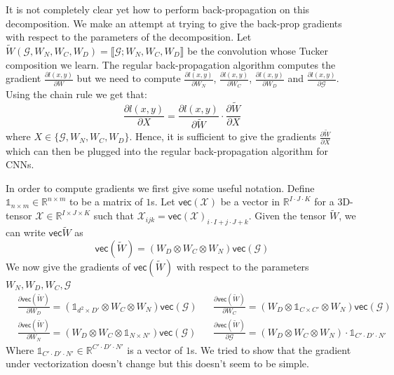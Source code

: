 \documentclass[a4paper]{article}
\newcommand{\R}{\mathbb{R}}
\begin{document}
It is not completely clear yet how to perform back-propagation on this decomposition. We make an attempt at trying to give the back-prop gradients with respect to the parameters of the decomposition. Let $\tilde{W}(\mathcal{G}, W_N, W_C, W_D) = \llbracket \mathcal{G}; W_N, W_C, W_D \rrbracket$ be the convolution whose Tucker composition we learn. The regular back-propagation algorithm computes the gradient $\frac{\partial l(x, y)}{\partial W}$ but we need to compute $\frac{\partial l(x, y)}{\partial W_N}$, $\frac{\partial l(x, y)}{\partial W_C}$, $\frac{\partial l(x, y)}{\partial W_D}$ and $\frac{\partial l(x, y)}{\partial \mathcal{G}}$. Using the chain rule we get that: 
$$\frac{\partial l(x, y)}{\partial X} = \frac{\partial l(x, y)}{\partial \tilde{W}} \cdot \frac{\partial \tilde{W}}{\partial X} $$ 
where $X \in \{\mathcal{G}, W_N, W_C, W_D\}$. Hence, it is sufficient to give the gradients $\frac{\partial \tilde{W}}{\partial X}$ which can then be plugged into the regular back-propagation algorithm for CNNs. 

In order to compute gradients we first give some useful notation. Define $\mathds{1}_{n \times m} \in \R^{n \times m}$ to be a matrix of $1$s. Let $\mathsf{vec}(\mathcal{X})$ be a vector in $\R^{I\cdot J \cdot K}$ for a 3D-tensor $\mathcal{X} \in \R^{I \times J \times K}$ such that $\mathcal{X}_{ijk} = \mathsf{vec}(\mathcal{X})_{i \cdot I + j \cdot J + k}$. Given the tensor $\tilde{W}$, we can write $\mathsf{vec}{\tilde{W}}$ as 
$$\mathsf{vec}(\tilde{W}) = (W_D \otimes W_C \otimes W_N)\mathsf{vec}(\mathcal{G}) $$ 
We now give the gradients of $\mathsf{vec}(\tilde{W})$ with respect to the parameters $W_N, W_D, W_C, \mathcal{G}$
\begin{align*}
&\frac{\partial \mathsf{vec}(\tilde{W})}{\partial W_D} = (\mathds{1}_{d^2 \times D'} \otimes W_C \otimes W_N)\mathsf{vec}(\mathcal{G})
&&\frac{\partial \mathsf{vec}(\tilde{W})}{\partial W_C} = (W_D \otimes \mathds{1}_{C \times C'} \otimes W_N)\mathsf{vec}(\mathcal{G}) \\ 
&\frac{\partial \mathsf{vec}(\tilde{W})}{\partial W_N} = (W_D \otimes W_C \otimes \mathds{1}_{N \times N'})\mathsf{vec}(\mathcal{G})
&&\frac{\partial \mathsf{vec}(\tilde{W})}{\partial \mathcal{G}} = (W_D \otimes W_C \otimes W_N) \cdot \mathds{1}_{C'\cdot D' \cdot N'}
\end{align*}
Where $\mathds{1}_{C'\cdot D' \cdot N'} \in \R^{C'\cdot D' \cdot N'}$ is a vector of $1$s. We tried to show that the gradient under vectorization doesn't change but this doesn't seem to be simple.   
\end{document}
